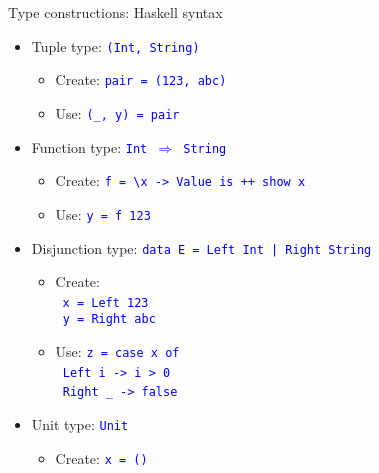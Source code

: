 \documentclass[english]{beamer}
\begin{document}
\begin{frame}{Type constructions: Haskell syntax}

\begin{itemize}
\item Tuple type: \texttt{\textcolor{blue}{\footnotesize{}(Int, String)}}{\footnotesize \par}
\begin{itemize}
\item Create: \texttt{\textcolor{blue}{\footnotesize{}pair = (123, \textquotedbl{}abc\textquotedbl{})}} 
\item Use: \texttt{\textcolor{blue}{\footnotesize{}(\_, y) = pair}}{\footnotesize \par}
\end{itemize}
\item Function type: \texttt{\textcolor{blue}{\footnotesize{}Int $\Rightarrow$
String}}{\footnotesize \par}
\begin{itemize}
\item Create: \texttt{\textcolor{blue}{\footnotesize{}f = \textbackslash{}x
-> \textquotedbl{}Value is \textquotedbl{} ++ show x}} 
\item Use: \texttt{\textcolor{blue}{\footnotesize{}y = f 123}}{\footnotesize \par}
\end{itemize}
\item Disjunction type: \texttt{\textcolor{blue}{\footnotesize{}data E =
Left Int | Right String}}{\footnotesize \par}
\begin{itemize}
\item Create:\\
\  \texttt{\textcolor{blue}{\footnotesize{}x = Left 123}}~\\
\texttt{\textcolor{blue}{\footnotesize{} y = Right \textquotedbl{}abc\textquotedbl{}}}{\footnotesize \par}
\item Use: \texttt{\textcolor{blue}{\footnotesize{}z = case x of}}~\\
\texttt{\textcolor{blue}{\footnotesize{} Left i -> i > 0}}~\\
\texttt{\textcolor{blue}{\footnotesize{} Right \_ -> false}}~\\
{\footnotesize \par}
\end{itemize}
\item Unit type: \texttt{\textcolor{blue}{\footnotesize{}Unit}}{\footnotesize \par}
\begin{itemize}
\item Create: \texttt{\textcolor{blue}{\footnotesize{}x = ()}}{\footnotesize \par}
\end{itemize}
\end{itemize}
\end{frame}
\end{document}
